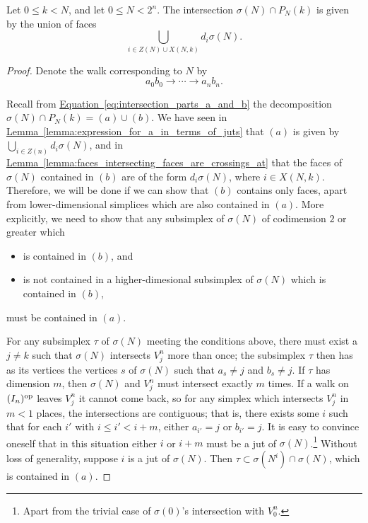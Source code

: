 \documentclass[main.tex]{subfiles}
\begin{document}
\begin{proposition}
  \label{prop:intersection_as_union_of_faces}
  Let $0 \leq k < N$, and let $0 \leq N < 2^{n}$. The intersection $\sigma(N) \cap P_{N}(k)$ is given by the union of faces
  \begin{equation*}
    \bigcup_{i \in Z(N) \cup X(N, k)} d_{i}\sigma(N).
  \end{equation*}
\end{proposition}
\begin{proof}
  Denote the walk corresponding to $N$ by
  \begin{equation*}
    a_{0}b_{0} \to \cdots \to a_{n}b_{n}.
  \end{equation*}

  Recall from \hyperref[eq:intersection_parts_a_and_b]{Equation~\ref*{eq:intersection_parts_a_and_b}} the decomposition $\sigma(N) \cap P_{N}(k) = (a) \cup (b)$. We have seen in \hyperref[lemma:expression_for_a_in_terms_of_juts]{Lemma~\ref*{lemma:expression_for_a_in_terms_of_juts}} that $(a)$ is given by $\bigcup_{i \in Z(n)} d_{i} \sigma(N)$, and in \hyperref[lemma:faces_intersecting_faces_are_crossings_at]{Lemma~\ref*{lemma:faces_intersecting_faces_are_crossings_at}} that the faces of $\sigma(N)$ contained in $(b)$ are of the form $d_{i}\sigma(N)$, where $i \in X(N, k)$. Therefore, we will be done if we can show that $(b)$ contains only faces, apart from lower-dimensional simplices which are also contained in $(a)$. More explicitly, we need to show that any subsimplex of $\sigma(N)$ of codimension $2$ or greater which
  \begin{itemize}
    \item is contained in $(b)$, and

    \item is not contained in a higher-dimesional subsimplex of $\sigma(N)$ which is contained in $(b)$,
  \end{itemize}
  must be contained in $(a)$.

  For any subsimplex $\tau$ of $\sigma(N)$ meeting the conditions above, there must exist a $j \neq k$ such that $\sigma(N)$ intersects $V^{n}_{j}$ more than once; the subsimplex $\tau$ then has as its vertices the vertices $s$ of $\sigma(N)$ such that $a_{s} \neq j$ and $b_{s} \neq j$. If $\tau$ has dimension $m$, then $\sigma(N)$ and $V^{n}_{j}$ must intersect exactly $m$ times. If a walk on $(I_{n})^{\mathrm{op}}$ leaves $V^{n}_{j}$ it cannot come back, so for any simplex which intersects $V^{n}_{j}$ in $m < 1$ places, the intersections are contiguous; that is, there exists some $i$ such that for each $i'$ with $i \leq i' < i + m$, either $a_{i'} = j$ or $b_{i'} = j$. It is easy to convince oneself that in this situation either $i$ or $i + m$ must be a jut of $\sigma(N)$.\footnote{Apart from the trivial case of $\sigma(0)$'s intersection with $V^{n}_{0}$.} Without loss of generality, suppose $i$ is a jut of $\sigma(N)$. Then $\tau \subset \sigma(N^{i}) \cap \sigma(N)$, which is contained in $(a)$.
\end{proof}
\end{document}
